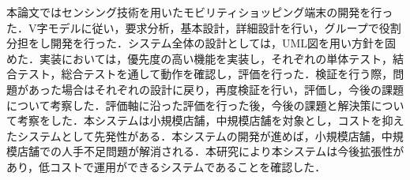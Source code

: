 
本論文ではセンシング技術を用いたモビリティショッピング端末の開発を行った．V字モデルに従い，要求分析，基本設計，詳細設計を行い，グループで役割分担をし開発を行った．システム全体の設計としては，UML図を用い方針を固めた．実装においては，優先度の高い機能を実装し，それぞれの単体テスト，結合テスト，総合テストを通して動作を確認し，評価を行った．検証を行う際，問題があった場合はそれぞれの設計に戻り，再度検証を行い，評価し，今後の課題について考察した．評価軸に沿った評価を行った後，今後の課題と解決策について考察をした．本システムは小規模店舗，中規模店舗を対象とし，コストを抑えたシステムとして先発性がある．本システムの開発が進めば，小規模店舗，中規模店舗での人手不足問題が解消される．本研究により本システムは今後拡張性があり，低コストで運用ができるシステムであることを確認した．